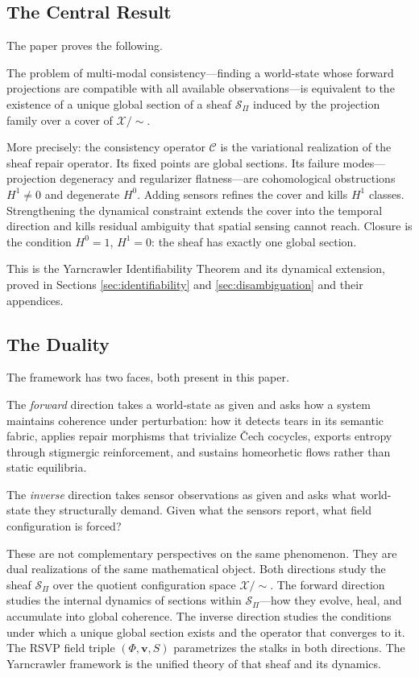 \documentclass[12pt, oneside]{article}
\newcommand{\Xmod}{\mathcal{X}/{\sim}}
\begin{document}
\subsection{The Central Result}

The paper proves the following.

The problem of multi-modal consistency---finding a world-state whose forward projections
are compatible with all available observations---is equivalent to the existence of a unique
global section of a sheaf $\mathcal{S}_\Pi$ induced by the projection family over a cover
of $\Xmod$.

More precisely: the consistency operator $\mathcal{C}$ is the variational realization of
the sheaf repair operator. Its fixed points are global sections. Its failure modes---
projection degeneracy and regularizer flatness---are cohomological obstructions $H^1 \ne 0$
and degenerate $H^0$. Adding sensors refines the cover and kills $H^1$ classes.
Strengthening the dynamical constraint extends the cover into the temporal direction and
kills residual ambiguity that spatial sensing cannot reach. Closure is the condition
$H^0 = 1$, $H^1 = 0$: the sheaf has exactly one global section.

This is the Yarncrawler Identifiability Theorem and its dynamical extension, proved in
Sections \ref{sec:identifiability} and \ref{sec:disambiguation} and their appendices.

\subsection{The Duality}

The framework has two faces, both present in this paper.

The \emph{forward} direction takes a world-state as given and asks how a system maintains
coherence under perturbation: how it detects tears in its semantic fabric, applies repair
morphisms that trivialize \v{C}ech cocycles, exports entropy through stigmergic
reinforcement, and sustains homeorhetic flows rather than static equilibria.

The \emph{inverse} direction takes sensor observations as given and asks what world-state
they structurally demand. Given what the sensors report, what field configuration is forced?

These are not complementary perspectives on the same phenomenon. They are dual realizations
of the same mathematical object. Both directions study the sheaf $\mathcal{S}_\Pi$ over the
quotient configuration space $\Xmod$. The forward direction studies the internal dynamics
of sections within $\mathcal{S}_\Pi$---how they evolve, heal, and accumulate into global
coherence. The inverse direction studies the conditions under which a unique global section
exists and the operator that converges to it. The RSVP field triple $(\Phi, \mathbf{v}, S)$
parametrizes the stalks in both directions. The Yarncrawler framework is the unified theory
of that sheaf and its dynamics.
\end{document}
